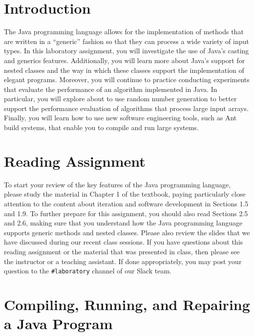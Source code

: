 

\usepackage[compact]{titlesec}



\section*{Introduction}

The Java programming language allows for the implementation of methods that are written in a ``generic'' fashion so that
they can process a wide variety of input types. In this laboratory assignment, you will investigate the use of Java's
casting and generics features. Additionally, you will learn more about Java's support for nested classes and the way in
which these classes support the implementation of elegant programs. Moreover, you will continue to practice conducting
experiments that evaluate the performance of an algorithm implemented in Java. In particular, you will explore about to
use random number generation to better support the performance evaluation of algorithms that process large input arrays.
Finally, you will learn how to use new software engineering tools, such as Ant build systems, that enable you to
compile and run large systems.

\section*{Reading Assignment}

To start your review of the key features of the Java programming language, please study the material in Chapter 1 of the
textbook, paying particularly close attention to the content about iteration and software development in Sections 1.5
and 1.9. To further prepare for this assignment, you should also read Sections 2.5 and 2.6, making sure that you
understand how the Java programming language supports generic methods and nested classes.  Please also review the slides
that we have discussed during our recent class sessions. If you have questions about this reading assignment or the
material that was presented in class, then please see the instructor or a teaching assistant. If done appropriately, you
may post your question to the {\tt \#laboratory} channel of our Slack team.

\section*{Compiling, Running, and Repairing a Java Program}

